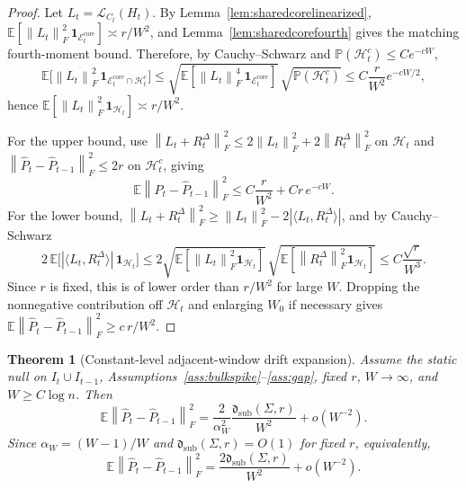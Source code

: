 \documentclass[11pt]{article}
\theoremstyle{tightplain}
\newtheorem{theorem}{Theorem}[section]
\theoremstyle{tightdef}
\newcommand{\E}{\mathbb E}
\newcommand{\Prob}{\mathbb P}
\newcommand{\norm}[1]{\left\lVert #1 \right\rVert}
\newcommand{\abs}[1]{\left\lvert #1 \right\rvert}
\newcommand{\one}{\mathbf 1}
\begin{document}
\begin{proof}
Let $L_t=\mathcal L_{C_t}(H_t)$. By Lemma~\ref{lem:sharedcorelinearized},
$\E[\norm{L_t}_F^2\,\one_{\mathcal E_t^{\mathrm{core}}}]\asymp r/W^2$, and
Lemma~\ref{lem:sharedcorefourth} gives the matching fourth-moment bound.
Therefore, by Cauchy--Schwarz and $\Prob(\mathcal H_t^c)\le Ce^{-cW}$,
\[
\E\bigl[
\norm{L_t}_F^2
\,\one_{\mathcal E_t^{\mathrm{core}}\cap \mathcal H_t^c}
\bigr]
\le
\sqrt{\E[\norm{L_t}_F^4\,\one_{\mathcal E_t^{\mathrm{core}}}]}\,\sqrt{\Prob(\mathcal H_t^c)}
\le
C\frac r{W^2}e^{-cW/2},
\]
hence $\E[\norm{L_t}_F^2\,\one_{\mathcal H_t}]\asymp r/W^2$.

For the upper bound, use
$\norm{L_t+R_t^\Delta}_F^2\le 2\norm{L_t}_F^2+2\norm{R_t^\Delta}_F^2$ on
$\mathcal H_t$ and $\norm{\widehat P_t-\widehat P_{t-1}}_F^2\le 2r$ on
$\mathcal H_t^c$, giving
\[
\E\norm{\widehat P_t-\widehat P_{t-1}}_F^2
\le
C\frac r{W^2}+C r\, e^{-cW}.
\]
For the lower bound,
$\norm{L_t+R_t^\Delta}_F^2\ge\norm{L_t}_F^2-2\abs{\langle L_t,R_t^\Delta\rangle}$,
and by Cauchy--Schwarz
\[
2\,\E\bigl[\abs{\langle L_t,R_t^\Delta\rangle}\,\one_{\mathcal H_t}\bigr]
\le
2\sqrt{\E[\norm{L_t}_F^2\one_{\mathcal H_t}]}\,\sqrt{\E[\norm{R_t^\Delta}_F^2\one_{\mathcal H_t}]}
\le
C\frac{\sqrt r}{W^3}.
\]
Since $r$ is fixed, this is of lower order than $r/W^2$ for large $W$. Dropping
the nonnegative contribution off $\mathcal H_t$ and enlarging $W_0$ if necessary
gives $\E\norm{\widehat P_t-\widehat P_{t-1}}_F^2\ge c\,r/W^2$.
\end{proof}

\begin{theorem}[Constant-level adjacent-window drift expansion]
\label{thm:adjacentconstantproved}
Assume the static null on $I_t\cup I_{t-1}$,
Assumptions~\ref{ass:bulkspike}--\ref{ass:gap}, fixed $r$, $W\to\infty$, and
$W\ge C\log n$. Then
\[
\E\norm{\widehat P_t-\widehat P_{t-1}}_F^2
=
\frac{2}{\alpha_W^2}
\frac{\mathfrak d_{\mathrm{sub}}(\Sigma,r)}{W^2}
+
o(W^{-2}).
\]
Since $\alpha_W=(W-1)/W$ and
$\mathfrak d_{\mathrm{sub}}(\Sigma,r)=O(1)$ for fixed $r$, equivalently,
\[
\E\norm{\widehat P_t-\widehat P_{t-1}}_F^2
=
\frac{2\mathfrak d_{\mathrm{sub}}(\Sigma,r)}{W^2}
+
o(W^{-2}).
\]
\end{theorem}
\end{document}
